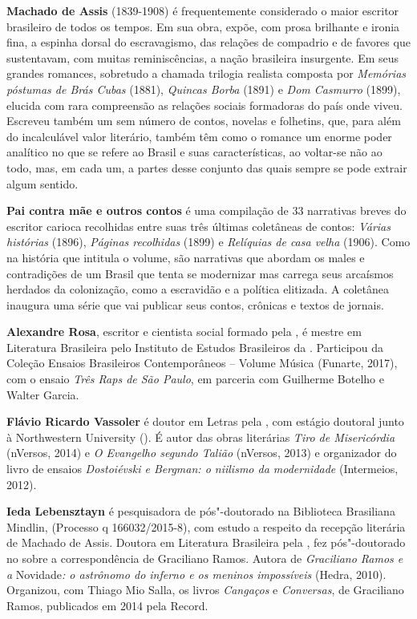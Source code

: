 \textbf{Machado de Assis} (1839-1908) é frequentemente considerado o maior escritor brasileiro de todos os tempos. Em sua obra, expõe, com prosa brilhante e ironia fina, a espinha dorsal do escravagismo, das relações de compadrio e de favores que sustentavam, com muitas reminiscências, a nação brasileira insurgente. Em seus grandes romances, sobretudo a chamada trilogia realista composta por \emph{Memórias póstumas de Brás Cubas} (1881), \emph{Quincas Borba} (1891) e \emph{Dom Casmurro} (1899), elucida com rara compreensão as relações sociais formadoras do país onde viveu. Escreveu também um sem número de contos, novelas e folhetins, que, para além do incalculável valor literário, também têm como o romance um enorme poder analítico no que se refere ao Brasil e suas características, ao voltar-se não ao todo, mas, em cada um, a partes desse conjunto das quais sempre se pode extrair algum sentido.

\textbf{Pai contra mãe e outros contos} é uma compilação de 33 narrativas breves do escritor carioca recolhidas entre suas três últimas coletâneas de contos: \emph{Várias histórias} (1896), \emph{Páginas recolhidas} (1899) e \emph{Relíquias de casa velha} (1906). Como na história que intitula o volume, são narrativas que abordam os males e contradições de um Brasil que tenta se modernizar mas carrega seus arcaísmos herdados da colonização, como a escravidão e a política elitizada. A coletânea inaugura uma série que vai publicar seus contos, crônicas e textos de jornais.  

\textbf{Alexandre Rosa}, escritor e
  cientista social formado pela , é mestre em Literatura
  Brasileira pelo Instituto de Estudos Brasileiros da . Participou da
  Coleção Ensaios Brasileiros Contemporâneos -- Volume Música (Funarte,
  2017), com o ensaio \emph{Três Raps de São Paulo}, em parceria com
  Guilherme Botelho e Walter Garcia.

\textbf{Flávio Ricardo Vassoler} é doutor em Letras pela , com estágio doutoral junto à
  Northwestern University (). É autor das obras literárias \emph{Tiro
  de Misericórdia} (nVersos, 2014) e \emph{O Evangelho segundo Talião}
  (nVersos, 2013) e organizador do livro de ensaios \emph{Dostoiévski e
  Bergman: o niilismo da modernidade} (Intermeios, 2012).

\textbf{Ieda Lebensztayn} é
  pesquisadora de pós"-doutorado na Biblioteca Brasiliana Mindlin,
   (Processo q 166032/2015-8), com estudo a
  respeito da recepção literária de Machado de Assis. Doutora em
  Literatura Brasileira pela , fez pós"-doutorado no 
  sobre a correspondência de Graciliano Ramos. Autora de
  \emph{Graciliano Ramos e a} Novidade\emph{: o astrônomo do inferno e
  os meninos impossíveis} (Hedra, 2010). Organizou, com Thiago Mio
  Salla, os livros \emph{Cangaços} e \emph{Conversas}, de Graciliano
  Ramos, publicados em 2014 pela Record.





